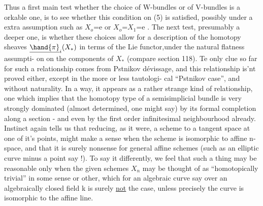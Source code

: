 Thus a first main test whether the choice of W-bundles or of
V-bundles is a orkable one,  is to see whether this condition on (5)
is satisfied,  possibly under a  extra assumption  such as $X_{o}$=e  or
$X_{o}$=$X_{1}$=e .  The next test,  presumably a deeper one,  is whether these
choices allow for a description of the homotopy sheaves $\underline{\hand{\pi}}_{i}(X_{*})$  in
terms of the Lie functor,under  the natural flatness assumpti-%
on on the components of $X_{*}$  (compare  section 118).  Te only clue so
far for such a relationship comes from Pstnikov dévissage,  and this
relationship is'nt proved either, except in the more or less tautologi-%
cal ``Pstnikov case'',  and without naturality.  In a way,  it appears
as a rather strange kind of relationship,  one which implies that the
homotopy type of a semisimplicial bundle is very strongly dominated
(almost determined, one might say) by 
 its formal completion along a
section  -  and even by the first order infinitesimal neighbourhood
already.  Instinct again tells us that reducing,  as it were,  a
scheme to a tangent space at one of it's points,  might make a sense
when the scheme is isomorphic to affine n-space,  and that it is surely
nonsense for general affine schemes (such as an elliptic curve minus a
point\xout{,} say !).  To say it differently,  we feel that such a thing may
be reasonable\xout{,} only when the given schemes $X_{n}$ may be thought of as
``homotopically trivial'' in some sense or other,   which for an
algebraic curve say over an algebraically closed field k is surely \uline{not}
the case,  unless precisely the curve is isomorphic to the affine line.


